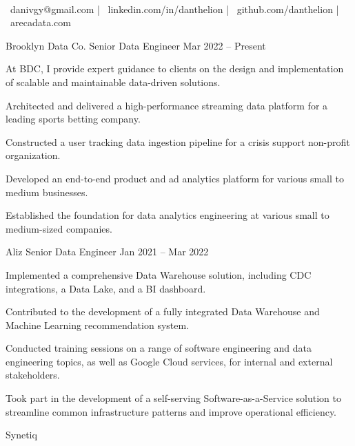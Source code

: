 \documentclass[]{awesome-cv}
\begin{document}
    
\begin{center}
	  \\
	\vspace{2mm}
	{\faEnvelope\ danivgy@gmail.com} | {\faLink\ linkedin.com/in/danthelion} | {\faLink\ github.com/danthelion} | {\faLink\ arecadata.com}
\end{center}
\begin{cventries}
	\cventry
	{Brooklyn Data Co.}
	{Senior Data Engineer}
	{Mar 2022 – Present}
	{}
	{\begin{cvitems}
		\item {At BDC, I provide expert guidance to clients on the design and implementation of scalable and maintainable data-driven solutions.}
		\item {Architected and delivered a high-performance streaming data platform for a leading sports betting company.}
		\item {Constructed a user tracking data ingestion pipeline for a crisis support non-profit organization.}
		\item {Developed an end-to-end product and ad analytics platform for various small to medium businesses.}
		\item {Established the foundation for data analytics engineering at various small to medium-sized companies.}
		\end{cvitems}}
	\cventry
	{Aliz}
	{Senior Data Engineer}
	{Jan 2021 – Mar 2022}
	{}
	{\begin{cvitems}
		\item {Implemented a comprehensive Data Warehouse solution, including CDC integrations, a Data Lake, and a BI dashboard.}
		\item {Contributed to the development of a fully integrated Data Warehouse and Machine Learning recommendation system.}
		\item {Conducted training sessions on a range of software engineering and data engineering topics, as well as Google Cloud services, for internal and external stakeholders.}
		\item {Took part in the development of a self-serving Software-as-a-Service solution to streamline common infrastructure patterns and improve operational efficiency.}
		\end{cvitems}}
	\cventry
	{Synetiq}

\end{cventries}
\end{document}
